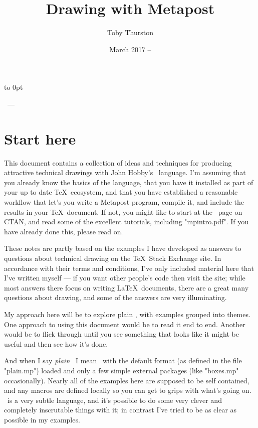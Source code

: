 \documentclass[a4paper,landscape]{article}
\title{Drawing with Metapost}
\author{Toby Thurston}
\date{March 2017 – }
\begin{document}
\pagestyle{empty}
\raggedbottom
\makeatletter
\moveright 6in\vbox to
0pt{\vskip23pt\noindent\sffamily{\Large\bfseries\@title}\par\bigskip
    \noindent\@author\ --- \@date\par
    \bigskip
\vss}
\makeatother
\section{Start here}

This document contains a collection of ideas and techniques for producing attractive
technical drawings with John Hobby’s \MP\ language.  I’m assuming that you already
know the basics of the language, that you have it installed as part of your up to
date \TeX\ ecosystem, and that you have established a reasonable workflow that
let’s you write a Metapost program, compile it, and include the results in your
\TeX\ document.  If not, you might like to start at the \MP\ page on CTAN, and read
some of the excellent tutorials, including "mpintro.pdf".  If you have already done
this, please read on.

These notes are partly based on the examples I have developed as answers
to questions about technical drawing on the \TeX\ Stack Exchange site.  In
accordance with their terms and conditions, I’ve only included material here that
I’ve written myself --- if you want other people’s code then visit the site;
while most answers there focus on writing \LaTeX\ documents, there are a great
many questions about drawing, and some of the answers are very illuminating.

My approach here will be to explore plain \MP, with examples grouped
into themes.  One approach to using this document would be to read it end to end.
Another would be to flick through until you see something that looks like it might
be useful and then see how it’s done.

And when I say \textit{plain} \MP\ I mean \MP\ with the default format (as defined
in the file "plain.mp") loaded and only a few simple external packages (like
"boxes.mp" occasionally).  Nearly all of the examples here are supposed to be self
contained, and any macros are defined locally so you can get to grips with what’s
going on.  \MP\ is a very subtle language, and it’s possible to do some very clever
and completely inscrutable things with it;  in contrast I’ve tried to be as clear as
possible in my examples.
\end{document}
